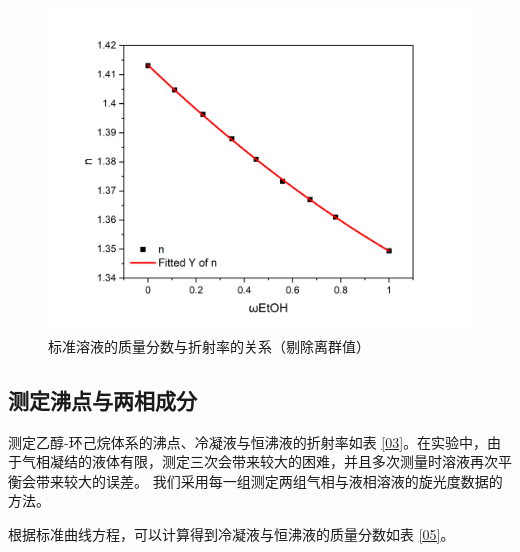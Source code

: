 \documentclass[cn,hazy,pku,12pt,normal,math=newtx,cite=super]{elegantnote}
\begin{document}
\begin{figure}[htbp]
    \centering
    \includegraphics[width = .70\textwidth]{image/Graph4.png}
    \caption{标准溶液的质量分数与折射率的关系（剔除离群值）}\label{4}
\end{figure}

\newpage

\subsection[short]{测定沸点与两相成分}

    测定乙醇-环己烷体系的沸点、冷凝液与恒沸液的折射率如表 \ref{03}。在实验中，由于气相凝结的液体有限，测定三次会带来较大的困难，并且多次测量时溶液再次平衡会带来较大的误差。
    我们采用每一组测定两组气相与液相溶液的旋光度数据的方法。

    根据标准曲线方程，可以计算得到冷凝液与恒沸液的质量分数如表 \ref{05}。
\end{document}
